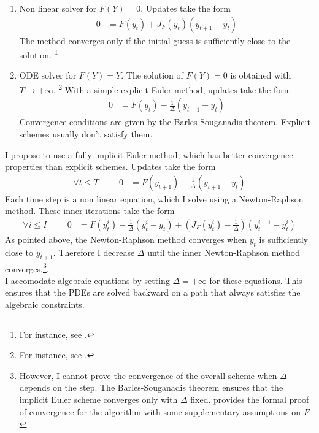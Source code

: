 \documentclass[english]{article}
\begin{document}
\begin{enumerate}
	\item Non linear solver for $F (Y ) = 0$. Updates take the form
	\begin{align*}
		0 &= F(y_{t}) + J_{F}(y_t) (y_{t+1} - y_t)
	\end{align*}
	The method converges only if the initial guess is sufficiently close to the solution. \footnote{For instance, see \citet{campbell1999force}.}
	\item ODE solver for $F(Y) = \dot{Y}$. The solution of $F(Y)=0$ is obtained with $T\rightarrow +\infty$. \footnote{For instance, see \citet{ditellabalance}.}
	With a simple explicit Euler method, updates take the form
	\begin{align*}
		0&= F(y_t) - \frac{1}{\Delta} (y_{t+1} -y_{t})
	\end{align*}
	Convergence conditions are given by the Barles-Souganadis theorem. Explicit schemes usually don't satisfy them.
\end{enumerate}
I propose to use a fully implicit Euler method, which has better convergence properties than explicit schemes.  Updates take the form 
\begin{align*}
	\forall t \leq T \hspace{1cm} 0&= F(y_{t+1}) - \frac{1}{\Delta}(y_{t+1} -y_{t})
\end{align*}
Each time step is a non linear equation, which I solve using a Newton-Raphson method. These inner iterations take the form
\begin{align*}
	\forall i \leq I \hspace{1cm}	0 &= F(y_{t}^i) - \frac{1}{\Delta}(y_{t}^{i} -y_{t}) + (J_{F}(y_t^i) -  \frac{1}{\Delta})(y^{i+1}_{t} - y_t^i)
\end{align*}
As pointed above, the Newton-Raphson method converges when $y_t$ is sufficiently close to $y_{t+1}$. Therefore I decrease $\Delta$ until the inner Newton-Raphson method converges.\footnote{However, I cannot prove the convergence of the overall scheme when $\Delta$ depends on the step. The Barles-Souganadis theorem ensures that the implicit Euler scheme converges only with $\Delta$ fixed. 	\citet{kelley1998convergence} provides the formal proof of convergence for the algorithm with some supplementary assumptions on $F$}.\\
I accomodate algebraic equations by setting $\Delta = +\infty$ for these equations. This ensures that the PDEs are solved backward on a path that always satisfies the algebraic constraints.
\end{document}
